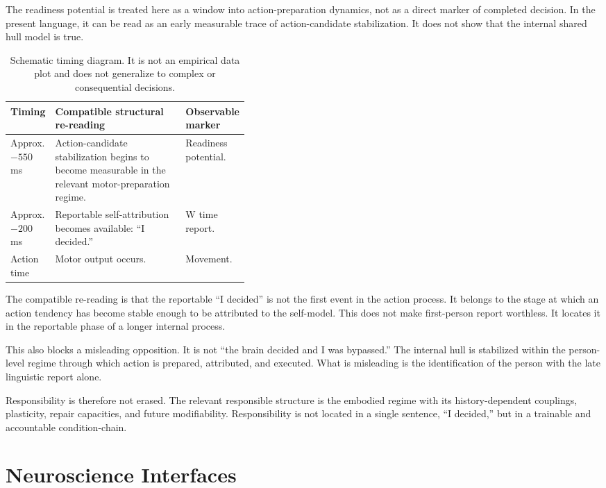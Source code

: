 \documentclass[12pt]{article}
\theoremstyle{definition}
\theoremstyle{remark}
\begin{document}
The readiness potential is treated here as a window into
action-preparation dynamics, not as a direct marker of completed
decision. In the present language, it can be read as an early measurable
trace of action-candidate stabilization. It does not show that the
internal shared hull model is true.

\begin{table}[H]
\centering
\begin{tabularx}{0.95\linewidth}{P{0.18\linewidth}Y P{0.22\linewidth}}
\toprule
\textbf{Timing} & \textbf{Compatible structural re-reading} & \textbf{Observable marker} \\
\midrule
Approx. \(-550\) ms &
Action-candidate stabilization begins to become measurable in the relevant motor-preparation regime. &
Readiness potential. \\
Approx. \(-200\) ms &
Reportable self-attribution becomes available: ``I decided.'' &
W time report. \\
Action time &
Motor output occurs. &
Movement. \\
\bottomrule
\end{tabularx}
\caption{Schematic timing diagram. It is not an empirical data plot and
does not generalize to complex or consequential decisions.}
\end{table}

The compatible re-reading is that the reportable ``I decided'' is not
the first event in the action process. It belongs to the stage at which
an action tendency has become stable enough to be attributed to the
self-model. This does not make first-person report worthless. It
locates it in the reportable phase of a longer internal process.

This also blocks a misleading opposition. It is not ``the brain decided
and I was bypassed.'' The internal hull is stabilized within the
person-level regime through which action is prepared, attributed, and
executed. What is misleading is the identification of the person with
the late linguistic report alone.

Responsibility is therefore not erased. The relevant responsible
structure is the embodied regime with its history-dependent couplings,
plasticity, repair capacities, and future modifiability. Responsibility
is not located in a single sentence, ``I decided,'' but in a trainable
and accountable condition-chain.

\section{Neuroscience Interfaces}
\end{document}
